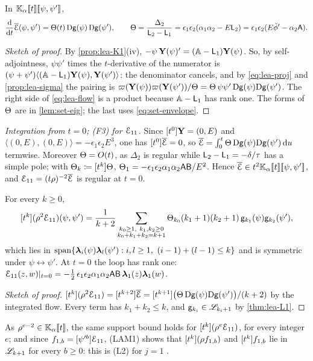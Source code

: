 \begin{thm}
\label{thm:lea-flow}
In $\mathbb{K}_{\alpha}[\![ t ]\!][\![ \psi,\psi' ]\!]$,
\begin{equation}
\label{eq:lea-flow}
\frac{\mathrm{d}}{\mathrm{d} t}\overline{\mathcal{E}}(\psi,\psi')=\Theta(t)\,\mathrm{D}\mathsf{g}(\psi)\,\mathrm{D}\mathsf{g}(\psi'),\qquad
\Theta=\frac{\Delta_2}{\mathsf{L}_2-\mathsf{L}_1}=\epsilon_1\epsilon_2(\alpha_1\alpha_2-E\mathsf{L}_2)=\epsilon_1\epsilon_2(E\breve{\phi}'-\alpha_2\mathsf{A}).
\end{equation}
\end{thm}

\begin{proof}[Sketch of proof]
By \cref{prop:lea-K1}(iv), $-\psi\,\mathbf{Y}(\psi)'=(\mathbb{A}-\mathsf{L}_1)\mathbf{Y}(\psi)$. So, by self-adjointness, $\psi\psi'$ times the $t$-derivative of the numerator is $(\psi+\psi')\langle(\mathbb{A}-\mathsf{L}_1)\mathbf{Y}(\psi),\mathbf{Y}(\psi')\rangle$: the denominator cancels, and by \eqref{eq:lea-proj} and \cref{prop:lea-sigma} the pairing is $\varpi(\mathbf{Y}(\psi))\varpi(\mathbf{Y}(\psi'))/\Theta=\Theta\,\psi\psi'\,\mathrm{D}\mathsf{g}(\psi)\mathrm{D}\mathsf{g}(\psi')$. The right side of \eqref{eq:lea-flow} is a product because $\mathbb{A}-\mathsf{L}_1$ has rank one. The forms of $\Theta$ are in \cref{lem:set-eig}; the last uses \eqref{eq:set-envelope}.
\end{proof}

\emph{Integration from $t=0$; (F3) for $\mathcal{E}_{11}$.} Since $[t^0]\mathbf{Y}=(0,E)$ and $\langle(0,E),(0,E)\rangle=-\epsilon_1\epsilon_2E^3$, one has $[t^0]\overline{\mathcal{E}}=0$, so $\overline{\mathcal{E}}=\int_0^t\Theta\,\mathrm{D}\mathsf{g}(\psi)\mathrm{D}\mathsf{g}(\psi')\,\mathrm{d} u$ termwise. Moreover $\Theta=O(t)$, as $\Delta_2$ is regular while $\mathsf{L}_2-\mathsf{L}_1=-\delta/\tau$ has a simple pole; with $\Theta_k\coloneqq[t^k]\Theta$, $\Theta_1=-\epsilon_1\epsilon_2\alpha_1\alpha_2\mathsf{A}\mathsf{B}/E^2$. Hence $\overline{\mathcal{E}}\in t^2\mathbb{K}_{\alpha}[\![ t ]\!][\![ \psi,\psi' ]\!]$, and $\mathcal{E}_{11}=(t\rho)^{-2}\overline{\mathcal{E}}$ is regular at $t=0$.

\begin{thm}
\label{thm:lea-L3}
For every $k\geq0$,
\[
\coef{t^k}(\rho^2\Edge_{11})(\psi,\psi')=\frac{1}{k+2}\sum_{\substack{k_0\geq1,\ k_1,k_2\geq0\\ k_0+k_1+k_2=k+1}}\Thf_{k_0}(k_1+1)(k_2+1)\,\gl_{k_1}(\psi)\gl_{k_2}(\psi') ,
\]
which lies in $\mathrm{span}\{\lf_i(\psi)\lf_l(\psi'):i,l\geq1,\ (i-1)+(l-1)\leq k\}$ and is symmetric under $\psi\leftrightarrow\psi'$. At $t=0$ the loop has rank one:
$\mathcal{E}_{11}(z,w)|_{t=0}=-\tfrac12\,\epsilon_1\epsilon_2\alpha_1\alpha_2\mathsf{A}\mathsf{B}\,\boldsymbol{\lambda}_1(z)\boldsymbol{\lambda}_1(w)$.
\end{thm}

\begin{proof}[Sketch of proof]
$[t^k](\rho^2\mathcal{E}_{11})=[t^{k+2}]\overline{\mathcal{E}}=[t^{k+1}]\big(\Theta\,\mathrm{D}\mathsf{g}(\psi)\mathrm{D}\mathsf{g}(\psi')\big)/(k+2)$ by the integrated flow. Every term has $k_1+k_2\leq k$, and $\mathsf{g}_{k_i}\in\mathscr{L}_{k_i+1}$ by \cref{thm:lea-L1}.
\end{proof}

As $\rho^{e-2}\in\mathbb{K}_{\alpha}[\![ t ]\!]$, the same support bound holds for $[t^k](\rho^e\mathcal{E}_{11})$, for every integer $e$; and since $f_{1,b}=[\psi'^b]\mathcal{E}_{11}$, (LAM1) shows that $[t^k](\rho f_{1,b})$ and $[t^k]f_{1,b}$ lie in $\mathscr{L}_{k+1}$ for every $b\geq0$: this is (L2) for $j=1$ .
